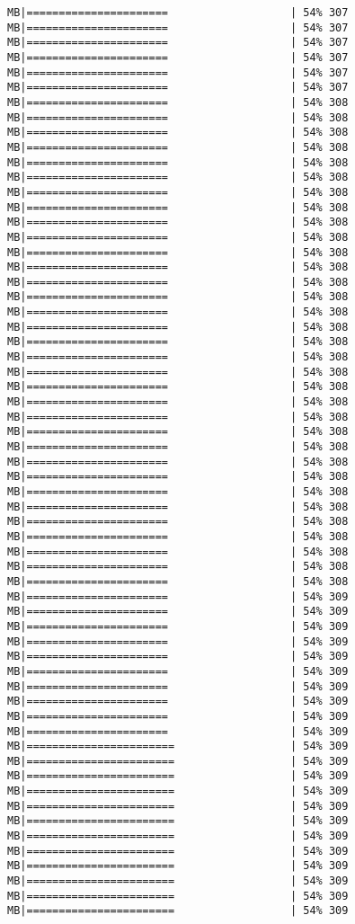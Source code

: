 \documentclass[
]{article}
\begin{document}
\begin{verbatim}
MB|======================                   | 54% 307 MB|======================                   | 54% 307 MB|======================                   | 54% 307 MB|======================                   | 54% 307 MB|======================                   | 54% 307 MB|======================                   | 54% 307 MB|======================                   | 54% 308 MB|======================                   | 54% 308 MB|======================                   | 54% 308 MB|======================                   | 54% 308 MB|======================                   | 54% 308 MB|======================                   | 54% 308 MB|======================                   | 54% 308 MB|======================                   | 54% 308 MB|======================                   | 54% 308 MB|======================                   | 54% 308 MB|======================                   | 54% 308 MB|======================                   | 54% 308 MB|======================                   | 54% 308 MB|======================                   | 54% 308 MB|======================                   | 54% 308 MB|======================                   | 54% 308 MB|======================                   | 54% 308 MB|======================                   | 54% 308 MB|======================                   | 54% 308 MB|======================                   | 54% 308 MB|======================                   | 54% 308 MB|======================                   | 54% 308 MB|======================                   | 54% 308 MB|======================                   | 54% 308 MB|======================                   | 54% 308 MB|======================                   | 54% 308 MB|======================                   | 54% 308 MB|======================                   | 54% 308 MB|======================                   | 54% 308 MB|======================                   | 54% 308 MB|======================                   | 54% 308 MB|======================                   | 54% 308 MB|======================                   | 54% 308 MB|======================                   | 54% 309 MB|======================                   | 54% 309 MB|======================                   | 54% 309 MB|======================                   | 54% 309 MB|======================                   | 54% 309 MB|======================                   | 54% 309 MB|======================                   | 54% 309 MB|======================                   | 54% 309 MB|======================                   | 54% 309 MB|======================                   | 54% 309 MB|=======================                  | 54% 309 MB|=======================                  | 54% 309 MB|=======================                  | 54% 309 MB|=======================                  | 54% 309 MB|=======================                  | 54% 309 MB|=======================                  | 54% 309 MB|=======================                  | 54% 309 MB|=======================                  | 54% 309 MB|=======================                  | 54% 309 MB|=======================                  | 54% 309 MB|=======================                  | 54% 309 MB|=======================                  | 54% 309 
\end{verbatim}
\end{document}
